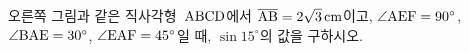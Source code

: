 \noindent\begin{minipage}[t]{0.58\linewidth}\vspace{0pt}\raggedright 오른쪽 그림과 같은 직사각형~$\mathrm{ABCD}$에서 $\overline{\mathrm{AB}}=2\sqrt{3}\,\mathrm{cm}$이고, $\angle\mathrm{AEF}=90^\circ$, $\angle\mathrm{BAE}=30^\circ$, $\angle\mathrm{EAF}=45^\circ$일 때, $\sin 15^\circ$의 값을 구하시오.\end{minipage}\hfill\begin{minipage}[t]{0.4\linewidth}\vspace{0pt}\centering \resizebox{\ifdim\width>\linewidth\linewidth\else\width\fi}{!}{}\end{minipage}\par
